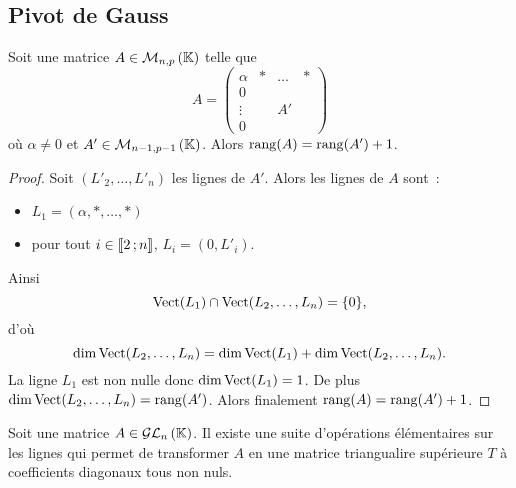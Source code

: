 \subsection{Pivot de Gauss}
%
\begin{lemme}
  Soit une matrice \(A \in \mathcal{M}_{n,p}\left(\mathbb{K}\right)\) telle que
  \begin{equation}
    A =
    \begin{pmatrix}
      \alpha & * & \ldots & * \\
      0 & & & \\
      \vdots & & A' & \\
    0 & & & \end{pmatrix}
  \end{equation}
  où \(\alpha \neq 0\) et \(A'\in \mathcal{M}_{n-1,p-1}\left(\mathbb{K}\right)\). Alors \(\operatorname{rang}(A) = 
  \operatorname{rang}(A')+1\).
\end{lemme}
\begin{proof}
  Soit \((L'_2, \ldots, L'_n)\) les lignes de \(A'\). Alors les lignes de \(A\) 
  sont~:
  \begin{itemize}
    \item \(L_1 = (\alpha, *, \ldots, *)\)
    \item pour tout \(i \in \mathopen{\llbracket}2\mathclose{}\mathpunct{};n\mathclose{\rrbracket}\), \(L_i = (0,L'_i)\).
  \end{itemize}
  Ainsi
  \begin{equation}
    \operatorname{Vect}(L_1) \cap \operatorname{Vect}(L_2, \ldots, L_n) = \{0\},
  \end{equation}
  d'où
  \begin{equation}
    \dim \operatorname{Vect}(L_2, \ldots, L_n) = \dim \operatorname{Vect}(L_1) + \dim 
    \operatorname{Vect}(L_2, \ldots, L_n).
  \end{equation}
  La ligne \(L_1\) est non nulle donc \(\dim \operatorname{Vect}(L_1) = 1\). De plus 
  \(\dim \operatorname{Vect}(L_2, \ldots, L_n) = \operatorname{rang}(A')\). Alors finalement \(\operatorname{rang}(A) 
  = \operatorname{rang}(A')+1\).
\end{proof}
%
\begin{prop}
  Soit une matrice \(A \in \mathcal{GL}_{n}\left(\mathbb{K}\right)\). Il existe une suite d'opérations 
  élémentaires sur les lignes qui permet de transformer \(A\) en une matrice 
  triangualire supérieure \(T\) à coefficients diagonaux tous non nuls.
\end{prop}

